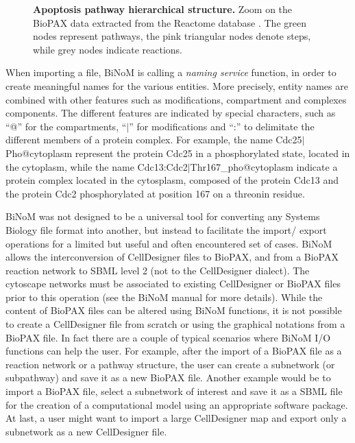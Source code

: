 \documentclass[10pt]{bmc_article}
\newenvironment{bmcformat}{\baselineskip20pt\sloppy\setboolean{publ}{false}}{\baselineskip20pt\sloppy}
\begin{document}
\begin{bmcformat}
\begin{figure}[h]
 \caption{\label{apoptosishierarchical}  \textbf{Apoptosis pathway hierarchical
structure.} Zoom on the BioPAX data extracted from the Reactome database
\cite{joshi2005reactome}. The green nodes represent pathways, the pink
triangular nodes denote steps, while grey nodes indicate reactions.}
\end{figure}


When importing a file, BiNoM is calling a \emph{naming service} function, in
order to create meaningful names for the various entities. More precisely,
entity names are combined with other features such as modifications, compartment
and complexes components. The different features are indicated by special
characters, such as ``@'' for the compartments, ``$|$'' for modifications and
``:'' to delimitate the different members of a protein complex. For example, the
name Cdc25$|$Pho@cytoplasm represent the protein Cdc25 in a phosphorylated
state, located in the cytoplasm, while the name
Cdc13:Cdc2$|$Thr167\_pho@cytoplasm indicate a protein complex located in the
cytosplasm, composed of the protein Cdc13 and the protein Cdc2 phosphorylated at
position 167 on a threonin residue.

BiNoM was not designed to be a universal tool for converting any Systems Biology
file format into another, but instead to facilitate the import/ export
operations for a limited but useful and often encountered set of cases. BiNoM allows the
interconversion of CellDesigner files to BioPAX, and from a BioPAX
reaction network to SBML level 2 (not to the CellDesigner dialect). The
cytoscape networks must be associated to existing CellDesigner or BioPAX files
prior to this operation (see the BiNoM manual for more details). While the
content of BioPAX files can be altered using BiNoM functions, it is not possible
to create a CellDesigner file from scratch or using the graphical notations from
a BioPAX file. In fact there are a couple of typical scenarios where BiNoM I/O
functions can help the user. For example, after the import of a BioPAX file as a
reaction network or a pathway structure, the user can create a subnetwork (or
subpathway) and save it as a new BioPAX file. Another example would be to import
a BioPAX file, select a subnetwork of interest and save it as a SBML file for
the creation of a computational model using an appropriate software package.
At last, a user might want to import a large CellDesigner map and export only a
subnetwork as a new CellDesigner file.  



\end{bmcformat}
\end{document}
